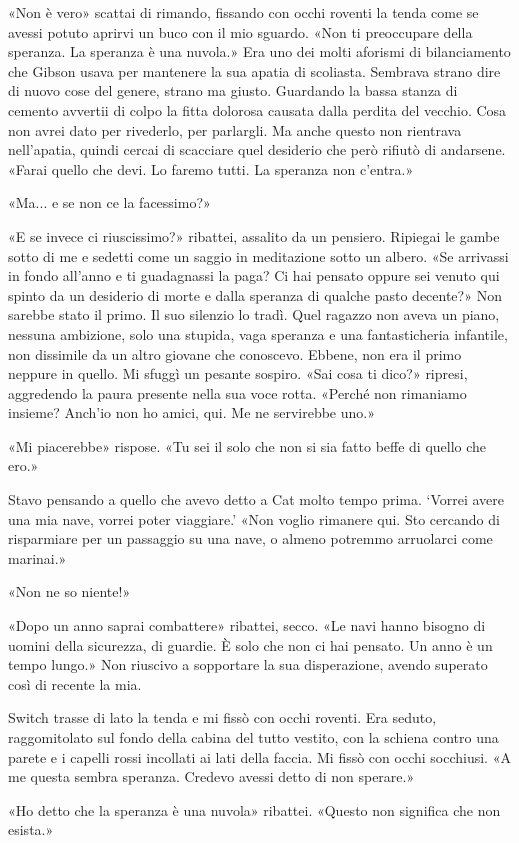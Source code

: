 «Non è vero» scattai di rimando, fissando con occhi roventi la tenda
come se avessi potuto aprirvi un buco con il mio sguardo. «Non ti
preoccupare della speranza. La speranza è una nuvola.» Era uno dei molti
aforismi di bilanciamento che Gibson usava per mantenere la sua apatia
di scoliasta. Sembrava strano dire di nuovo cose del genere, strano ma
giusto. Guardando la bassa stanza di cemento avvertii di colpo la fitta
dolorosa causata dalla perdita del vecchio. Cosa non avrei dato per
rivederlo, per parlargli. Ma anche questo non rientrava nell'apatia,
quindi cercai di scacciare quel desiderio che però rifiutò di andarsene.
«Farai quello che devi. Lo faremo tutti. La speranza non c'entra.»

«Ma... e se non ce la facessimo?»

«E se invece ci riuscissimo?» ribattei, assalito da un pensiero.
Ripiegai le gambe sotto di me e sedetti come un saggio in meditazione
sotto un albero. «Se arrivassi in fondo all'anno e ti guadagnassi la
paga? Ci hai pensato oppure sei venuto qui spinto da un desiderio di
morte e dalla speranza di qualche pasto decente?» Non sarebbe stato il
primo. Il suo silenzio lo tradì. Quel ragazzo non aveva un piano,
nessuna ambizione, solo una stupida, vaga speranza e una fantasticheria
infantile, non dissimile da un altro giovane che conoscevo. Ebbene, non
era il primo neppure in quello. Mi sfuggì un pesante sospiro. «Sai cosa
ti dico?» ripresi, aggredendo la paura presente nella sua voce rotta.
«Perché non rimaniamo insieme? Anch'io non ho amici, qui. Me ne
servirebbe uno.»

«Mi piacerebbe» rispose. «Tu sei il solo che non si sia fatto beffe di
quello che ero.»

Stavo pensando a quello che avevo detto a Cat molto tempo prima. `Vorrei
avere una mia nave, vorrei poter viaggiare.' «Non voglio rimanere qui.
Sto cercando di risparmiare per un passaggio su una nave, o almeno
potremmo arruolarci come marinai.»

«Non ne so niente!»

«Dopo un anno saprai combattere» ribattei, secco. «Le navi hanno bisogno
di uomini della sicurezza, di guardie. È solo che non ci hai pensato. Un
anno è un tempo lungo.» Non riuscivo a sopportare la sua disperazione,
avendo superato così di recente la mia.

Switch trasse di lato la tenda e mi fissò con occhi roventi. Era seduto,
raggomitolato sul fondo della cabina del tutto vestito, con la schiena
contro una parete e i capelli rossi incollati ai lati della faccia. Mi
fissò con occhi socchiusi. «A me questa sembra speranza. Credevo avessi
detto di non sperare.»

«Ho detto che la speranza è una nuvola» ribattei. «Questo non significa
che non esista.»


